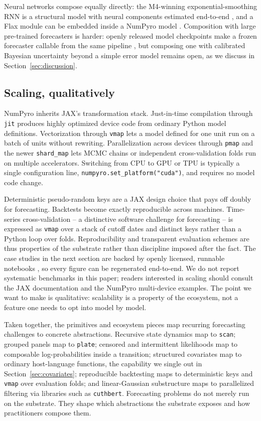 \documentclass[11pt,3p,review,authoryear]{elsarticle}
\begin{document}
Neural networks compose equally directly: the M4-winning exponential-smoothing RNN is a structural model with neural components estimated end-to-end \citep{smyl2020esrnn}, and a Flax module can be embedded inside a NumPyro model \citep{orduz_hierarchical_3}. Composition with large pre-trained forecasters is harder: openly released model checkpoints make a frozen forecaster callable from the same pipeline \citep{ansari2025chronos2, cohen2025toto}, but composing one with calibrated Bayesian uncertainty beyond a simple error model remains open, as we discuss in Section~\ref{sec:discussion}.

\subsection{Scaling, qualitatively}

NumPyro inherits JAX's transformation stack. Just-in-time compilation through \texttt{jit} produces highly optimized device code from ordinary Python model definitions. Vectorization through \texttt{vmap} lets a model defined for one unit run on a batch of units without rewriting. Parallelization across devices through \texttt{pmap} and the newer \texttt{shard\_map} lets MCMC chains or independent cross-validation folds run on multiple accelerators. Switching from CPU to GPU or TPU is typically a single configuration line, \texttt{numpyro.set\_platform("cuda")}, and requires no model code change.

Deterministic pseudo-random keys are a JAX design choice that pays off doubly for forecasting. Backtests become exactly reproducible across machines. Time-series cross-validation -- a distinctive software challenge for forecasting -- is expressed as \texttt{vmap} over a stack of cutoff dates and distinct keys rather than a Python loop over folds. Reproducibility and transparent evaluation schemes are thus properties of the substrate rather than discipline imposed after the fact. The case studies in the next section are backed by openly licensed, runnable notebooks \citep{orduz_pymc_labs}, so every figure can be regenerated end-to-end. We do not report systematic benchmarks in this paper; readers interested in scaling should consult the JAX documentation and the NumPyro multi-device examples. The point we want to make is qualitative: scalability is a property of the ecosystem, not a feature one needs to opt into model by model.

Taken together, the primitives and ecosystem pieces map recurring forecasting challenges to concrete abstractions. Recursive state dynamics map to \texttt{scan}; grouped panels map to \texttt{plate}; censored and intermittent likelihoods map to composable log-probabilities inside a transition; structured covariates map to ordinary host-language functions, the capability we single out in Section~\ref{sec:covariates}; reproducible backtesting maps to deterministic keys and \texttt{vmap} over evaluation folds; and linear-Gaussian substructure maps to parallelized filtering via libraries such as \texttt{cuthbert}. Forecasting problems do not merely run on the substrate. They shape which abstractions the substrate exposes and how practitioners compose them.
\end{document}

